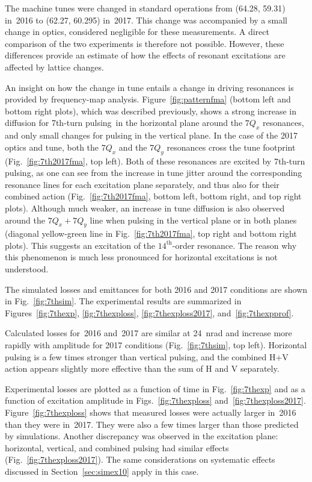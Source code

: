 \documentclass[%
 reprint,
 amsmath,amssymb,
 aps,
prstab,
longbibliography
]{revtex4-1}
\newcommand{\seventhtp}{7th-turn pulsing}
\begin{document}
The machine tunes were changed in standard operations from (64.28,
59.31) in~2016 to (62.27, 60.295) in~2017. This change was accompanied
by a small change in optics, considered negligible for these
measurements. A direct comparison of the two experiments is therefore
not possible. However, these differences provide an estimate of how
the effects of resonant excitations are affected by lattice changes.

An insight on how the change in tune entails a change in driving
resonances is provided by frequency-map analysis.
Figure~\ref{fig:patternfma} (bottom left and bottom right plots),
which was described previously, shows a strong increase in diffusion
for \seventhtp\ in the horizontal plane around the $7Q_x$ resonances,
and only small changes for pulsing in the vertical plane. In the case
of the 2017 optics and tune, both the $7Q_x$ and the $7Q_y$ resonances
cross the tune footprint (Fig.~\ref{fig:7th2017fma}, top left). Both
of these resonances are excited by \seventhtp, as one can see from the
increase in tune jitter around the corresponding resonance lines for
each excitation plane separately, and thus also for their combined
action (Fig.~\ref{fig:7th2017fma}, bottom left, bottom right, and top
right plots). Although much weaker, an increase in tune diffusion is
also observed around the $7Q_x + 7Q_y$ line when pulsing in the
vertical plane or in both planes (diagonal yellow-green line in
Fig.~\ref{fig:7th2017fma}, top right and bottom right plots). This
suggests an excitation of the $14^{\mathrm{th}}$-order resonance. The
reason why this phenomenon is much less pronounced for horizontal
excitations is not understood.

The simulated losses and emittances for both 2016 and 2017 conditions
are shown in Fig.~\ref{fig:7thsim}. The experimental results are
summarized in Figures~\ref{fig:7thexp}, \ref{fig:7thexploss},
\ref{fig:7thexploss2017}, and~\ref{fig:7thexpprof}.

Calculated losses for~2016 and~2017 are similar at 24~nrad and
increase more rapidly with amplitude for 2017 conditions
(Fig.~\ref{fig:7thsim}, top left). Horizontal pulsing is a few times
stronger than vertical pulsing, and the combined H+V action appears
slightly more effective than the sum of H and V separately.

Experimental losses are plotted as a function of time in
Fig.~\ref{fig:7thexp} and as a function of excitation amplitude in
Figs.~\ref{fig:7thexploss}
and~\ref{fig:7thexploss2017}. Figure~\ref{fig:7thexploss} shows that
measured losses were actually larger in~2016 than they were
in~2017. They were also a few times larger than those predicted by
simulations. Another discrepancy was observed in the excitation plane:
horizontal, vertical, and combined pulsing had similar effects
(Fig.~\ref{fig:7thexploss2017}). The same considerations on systematic
effects discussed in Section~\ref{sec:simex10} apply in this case.
\end{document}
